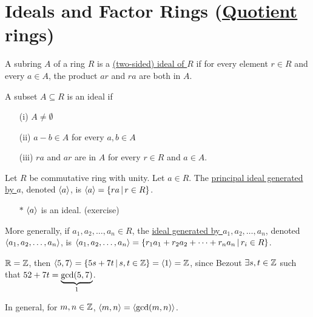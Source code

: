 \documentclass[]{article}
\begin{document}
\section{Ideals and Factor Rings (\ul{\ul{Quotient}} rings)}

\begin{definition}
	A subring $A$ of a ring $R$ is a \ul{(two-sided) ideal of $R$} if for every element $r\in R$ and every $a\in A$, the product $ar$ and $ra$ are both in $A$.
\end{definition}

\begin{theorem}
	 A subset $A\subseteq R$ is an ideal if
	\begin{itemize}
		\item[(i)] $A\neq\emptyset$
		\item[(ii)] $a-b\in A$ for every $a,b\in A$
		\item[(iii)] $ra$ and $ar$ are in $A$ for every $r\in R$ and $a\in A$.
	\end{itemize}
\end{theorem}

\begin{definition}
	Let $R$ be commutative ring with unity. Let $a\in R$.
	The \ul{principal ideal generated by $a$}, denoted $\gen a$, is $\gen a = \setm{ra}{r\in R}$.
	\begin{enumerate}
		\item[$*$] $\gen a$ is an ideal. (exercise)
	\end{enumerate}
\end{definition}

More generally, if $a_1,a_2,\dots,a_n\in R$, the \ul{ideal generated by $a_1,a_2,\dots,a_n$}, denoted $\gen{a_1,a_2,\dots,a_n}$, is $\gen{a_1,a_2,\dots,a_n} = \setm{r_1a_1+r_2a_2+\dots+r_na_n}{r_i\in R}$.
\begin{example}
	$\mb R=\mb Z$, then $\gen{5,7} = \setm{5s+7t}{s,t\in\mb Z} = \gen1=\mb Z$, since Bezout $\exists s,t\in\mb Z$ such that $52+7t=\ub{1}{\gcd(5,7)}$.
\end{example}
In general, for $m,n\in\mb Z$, $\gen{m,n}=\gen{\gcd(m,n)}$.
\end{document}
